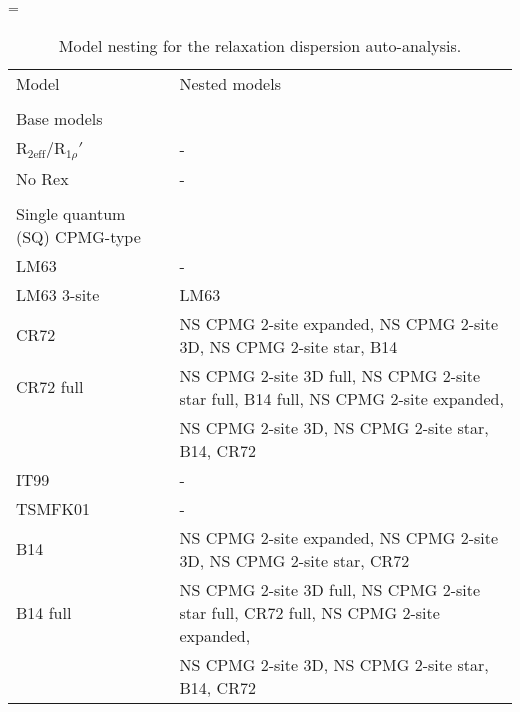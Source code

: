 \documentclass[a4paper,11pt,twoside,openright]{book}
\makeatletter
\let\realnormalsize=\normalsize
\def\liih@math{\ifmmode$\else\bad@math\fi}
\def\adjustnormalsize{\def\normalsize{\mathsurround=0pt \realnormalsize
 \parindent=0pt\abovedisplayskip=0pt\belowdisplayskip=0pt}%
 \def\phantompar{\csname par\endcsname}\normalsize}%
\newcommand\lthtmlvboxmathA{\adjustnormalsize\setbox\sizebox=\vbox\bgroup %
 \let\ifinner=\iffalse \let\)\liih@math }%
\newcommand\lthtmlmathtype[1]{\gdef\lthtmlmathenv{#1}}%
\newcommand\lthtmlfigureA[1]{\let\@savefreelist\@freelist
       \lthtmlmathtype{#1}\lthtmlvboxmathA}%
\makeatother
\begin{document}
{\newpage\clearpage
\lthtmlfigureA{landscape11760}%
\begin{landscape}

\begin{center}
\begin{small}
\par
\begin{longtable}{ll}
\par
\caption{Model nesting for the relaxation dispersion auto-analysis.}
\par
\\
\toprule
Model & Nested models\footnotemark [1]\\
\midrule
\endhead
\par
\bottomrule
\endfoot
\par
\par
\\[-5pt]
Base models \\
\cline{1-1}
$\mathrm{R}_{\textrm{2eff}}/\mathrm{R}_{1\rho}'$\          & - \\
No Rex                           & - \\
\par
\\[-5pt]
Single quantum (SQ) CPMG-type \\
\cline{1-1}
LM63                             & - \\
LM63 3-site                      & LM63 \\
CR72                             & NS CPMG 2-site expanded, NS CPMG 2-site 3D, NS CPMG 2-site star, B14 \\
CR72 full                        & NS CPMG 2-site 3D full, NS CPMG 2-site star full, B14 full, NS CPMG 2-site expanded, \\
                                 & NS CPMG 2-site 3D, NS CPMG 2-site star, B14, CR72 \\
IT99                             & - \\
TSMFK01                          & - \\
B14                              & NS CPMG 2-site expanded, NS CPMG 2-site 3D, NS CPMG 2-site star, CR72 \\
B14 full                         & NS CPMG 2-site 3D full, NS CPMG 2-site star full, CR72 full, NS CPMG 2-site expanded, \\
                                 & NS CPMG 2-site 3D, NS CPMG 2-site star, B14, CR72 \\

\end{longtable}
\end{small}
\end{center}
\end{landscape}}
\end{document}
